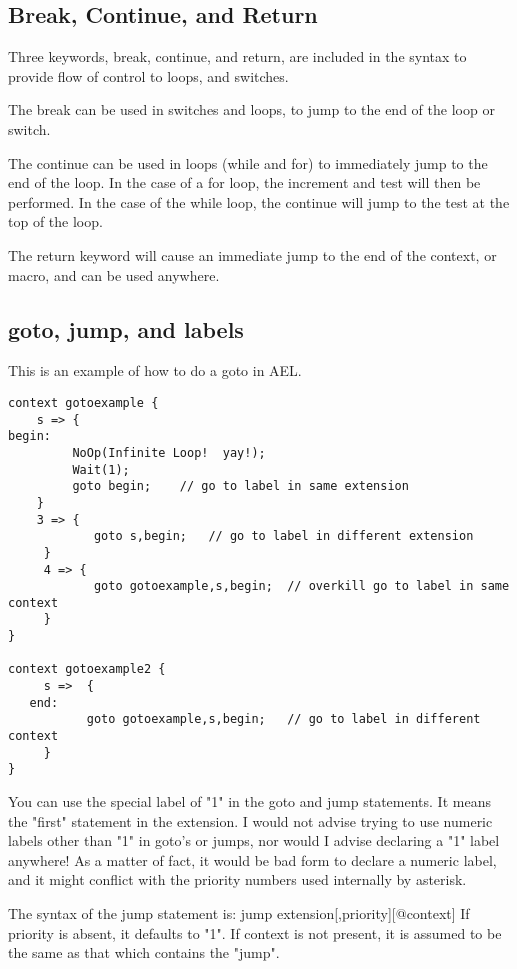 {\subsection{Break, Continue, and Return}

Three keywords, break, continue, and return, are included in the
syntax to provide flow of control to loops, and switches.

The break can be used in switches and loops, to jump to the end of the
loop or switch.

The continue can be used in loops (while and for) to immediately jump
to the end of the loop. In the case of a for loop, the increment and
test will then be performed. In the case of the while loop, the
continue will jump to the test at the top of the loop.

The return keyword will cause an immediate jump to the end of the
context, or macro, and can be used anywhere.



\subsection{goto, jump, and labels}

This is an example of how to do a goto in AEL.

\begin{astlisting}
\begin{verbatim}
context gotoexample {
    s => {
begin:
         NoOp(Infinite Loop!  yay!);
         Wait(1);
         goto begin;    // go to label in same extension
    }
    3 => {
            goto s,begin;   // go to label in different extension
     }
     4 => {
            goto gotoexample,s,begin;  // overkill go to label in same context
     }
}

context gotoexample2 {
     s =>  {
   end:
           goto gotoexample,s,begin;   // go to label in different context
     }
}
\end{verbatim}
\end{astlisting}

You can use the special label of "1" in the goto and jump
statements. It means the "first" statement in the extension. I would
not advise trying to use numeric labels other than "1" in goto's or
jumps, nor would I advise declaring a "1" label anywhere! As a matter
of fact, it would be bad form to declare a numeric label, and it might
conflict with the priority numbers used internally by asterisk.

The syntax of the jump statement is: jump
extension[,priority][@context] If priority is absent, it defaults to
"1". If context is not present, it is assumed to be the same as that
which contains the "jump".

}
